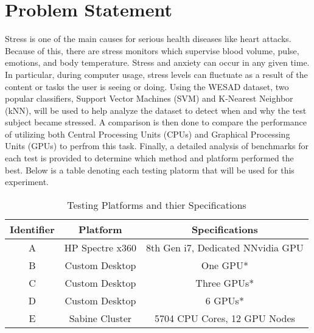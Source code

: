 \section{Problem Statement}
\label{sec:Problem-Statement}

Stress is one of the main causes for serious health diseases like heart attacks. 
Because of this, there are stress monitors which supervise  blood volume, pulse, emotions, and 
body temperature. Stress and anxiety can occur in any given time. In particular, during computer usage, stress levels 
can fluctuate as a result of the content or tasks the user is seeing or doing. Using the WESAD dataset, two popular 
classifiers, Support Vector Machines (SVM) and K-Nearest Neighbor (kNN), will be used to help analyze the dataset 
to detect when and why the test subject became stressed. 
A comparison is then done to compare the performance of utilizing both Central Processing Units (CPUs) and 
Graphical Processing Units (GPUs) to perfrom this task. 
Finally, a detailed analysis of benchmarks for each test is provided to determine which method and platform 
performed the best. Below is a table denoting each testing platorm that will be used for this experiment. 

\begin{table}[h!]
\centering
\caption{Testing Platforms and thier Specifications}
\label{table:testing-platforms}
\begin{tabular}{||c c c||} 
 \hline
 Identifier & Platform  & Specifications  	\\ [0.5ex] 
 \hline\hline
 A 	& HP Spectre x360 	 & 8th Gen i7, Dedicated NNvidia GPU 	\\ 
 B 	& Custom Desktop	 & One GPU*   	\\
 C 	& Custom Desktop	 & Three GPUs*	\\
 D 	& Custom Desktop	 & 6 GPUs*	\\
 E 	& Sabine Cluster	 & 5704 CPU Cores, 12 GPU Nodes 	 	\\ [1ex] 
 \hline
\end{tabular}
\end{table}
